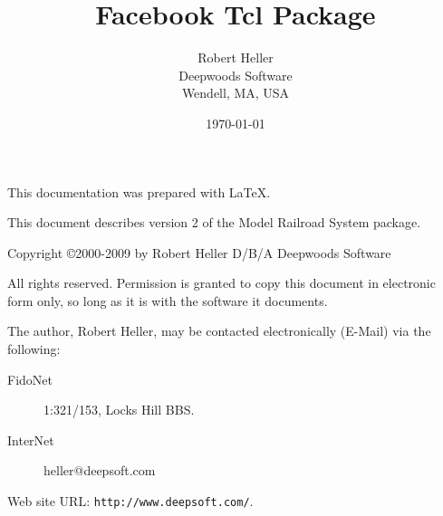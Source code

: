 \title{Facebook Tcl Package \\  \SubTitle}
\author{Robert Heller \\ Deepwoods Software \\ Wendell, MA, USA}
\date{\today}
\begin{titlepage}

\maketitle


\clearpage


This documentation was prepared with \LaTeX.

This document describes version 2 of the Model Railroad System package.

\vspace{.25in}



{\small Copyright \copyright 2000-2009 by Robert Heller D/B/A Deepwoods
Software}

\vspace{.25in}

All rights reserved.  Permission is granted to copy this document in
electronic form only, so long as it is with the software it
documents. 

The author, Robert Heller, may be contacted electronically (E-Mail) via
the following:

\begin{description}
\item[FidoNet] 1:321/153, Locks Hill BBS.
\item[InterNet] heller@deepsoft.com
\end{description}

Web site URL: {\tt http://www.deepsoft.com/}.

\thispagestyle{empty}
\setcounter{page}{0}
\clearpage

\end{titlepage}

